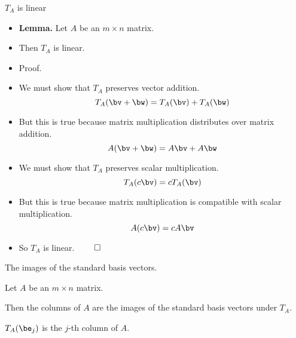 \documentclass{beamer}
\begin{document}
\begin{frame}{$T_A$ is linear}

\begin{itemize}
\item \textbf{Lemma.} Let $A$ be an $m\times n$ matrix.
\item Then $T_A$ is linear.
\item Proof.
\item We must show that $T_A$ preserves vector addition.
$$T_A(\bv + \bw) = T_A(\bv) + T_A(\bw)$$
\item But this is true because matrix multiplication distributes over matrix addition.
$$A(\bv + \bw) = A\bv + A\bw$$
\item We must show that $T_A$ preserves scalar multiplication.
$$T_A(c \bv) = c T_A(\bv)$$
\item But this is true because matrix multiplication is compatible with scalar multiplication.
$$A(c \bv ) = c A\bv$$
\item So $T_A$ is linear. $\qed$
\end{itemize}
\end{frame}

\beamerdefaultoverlayspecification{}

\begin{frame}{The images of the standard basis vectors.}

\begin{lemma}
Let $A$ be an $m\times n$ matrix.

\pause

\bigskip

Then the columns of $A$ are the
images of the standard basis vectors under $T_A$.

\bigskip


\pause

$T_A(\be_j)$ is the $j$-th column of $A$.
\end{lemma}
\end{frame}

\end{document}
